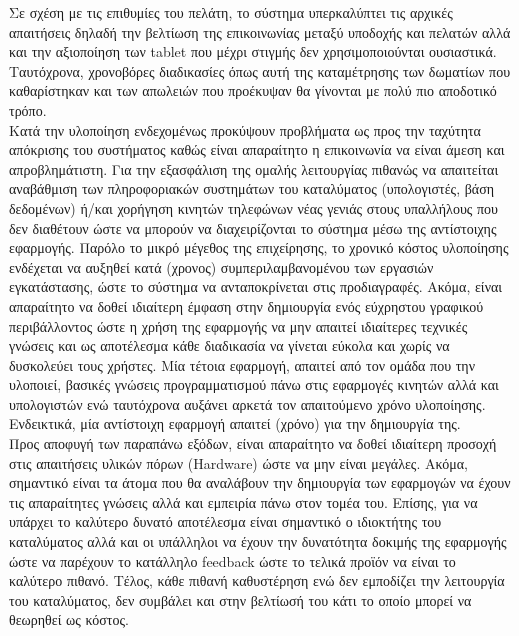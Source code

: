 \noindent
Σε σχέση με τις επιθυμίες του πελάτη, το σύστημα υπερκαλύπτει τις αρχικές απαιτήσεις δηλαδή την βελτίωση της επικοινωνίας μεταξύ υποδοχής και πελατών αλλά και την αξιοποίηση των tablet που μέχρι στιγμής δεν χρησιμοποιούνται ουσιαστικά. Ταυτόχρονα, χρονοβόρες διαδικασίες όπως αυτή της καταμέτρησης των δωματίων που καθαρίστηκαν και των απωλειών που προέκυψαν θα γίνονται με πολύ πιο αποδοτικό τρόπο. \\

\noindent
Κατά την υλοποίηση ενδεχομένως προκύψουν προβλήματα ως προς την ταχύτητα απόκρισης του συστήματος καθώς είναι απαραίτητο η επικοινωνία να είναι άμεση και απροβλημάτιστη. Για την εξασφάλιση της ομαλής λειτουργίας πιθανώς να απαιτείται αναβάθμιση των πληροφοριακών συστημάτων του καταλύματος (υπολογιστές, βάση δεδομένων) ή/και χορήγηση κινητών τηλεφώνων νέας γενιάς στους υπαλλήλους που δεν διαθέτουν ώστε  να μπορούν να διαχειρίζονται το σύστημα μέσω της αντίστοιχης εφαρμογής. Παρόλο το μικρό μέγεθος της επιχείρησης, το χρονικό κόστος υλοποίησης ενδέχεται να αυξηθεί κατά (χρονος) συμπεριλαμβανομένου των εργασιών εγκατάστασης, ώστε το σύστημα να ανταποκρίνεται στις προδιαγραφές.
Ακόμα, είναι απαραίτητο να δοθεί ιδιαίτερη έμφαση στην δημιουργία ενός εύχρηστου γραφικού περιβάλλοντος ώστε η χρήση της εφαρμογής να μην απαιτεί ιδιαίτερες τεχνικές γνώσεις και ως αποτέλεσμα κάθε διαδικασία να γίνεται εύκολα και χωρίς να δυσκολεύει τους χρήστες. Μία τέτοια εφαρμογή, απαιτεί από τον ομάδα που την υλοποιεί, βασικές γνώσεις προγραμματισμού πάνω στις εφαρμογές κινητών αλλά και υπολογιστών ενώ ταυτόχρονα αυξάνει αρκετά τον απαιτούμενο χρόνο υλοποίησης. Ενδεικτικά, μία αντίστοιχη εφαρμογή  απαιτεί (χρόνο) για την δημιουργία της.\\ 

\noindent
Προς αποφυγή των παραπάνω εξόδων, είναι απαραίτητο να δοθεί ιδιαίτερη προσοχή στις απαιτήσεις υλικών πόρων (Hardware) ώστε να μην είναι μεγάλες. Ακόμα, σημαντικό είναι τα άτομα που θα αναλάβουν την δημιουργία των εφαρμογών να έχουν τις απαραίτητες γνώσεις αλλά και εμπειρία πάνω στον τομέα του. Επίσης, για να υπάρχει το καλύτερο δυνατό αποτέλεσμα είναι σημαντικό ο ιδιοκτήτης του καταλύματος αλλά και οι υπάλληλοι να έχουν την δυνατότητα δοκιμής της εφαρμογής ώστε να παρέχουν το κατάλληλο feedback ώστε το τελικά προϊόν να είναι το καλύτερο πιθανό. Τέλος, κάθε πιθανή καθυστέρηση ενώ δεν εμποδίζει την λειτουργία του καταλύματος, δεν συμβάλει και στην βελτίωσή του κάτι το οποίο μπορεί να θεωρηθεί ως κόστος.
		
		
		    